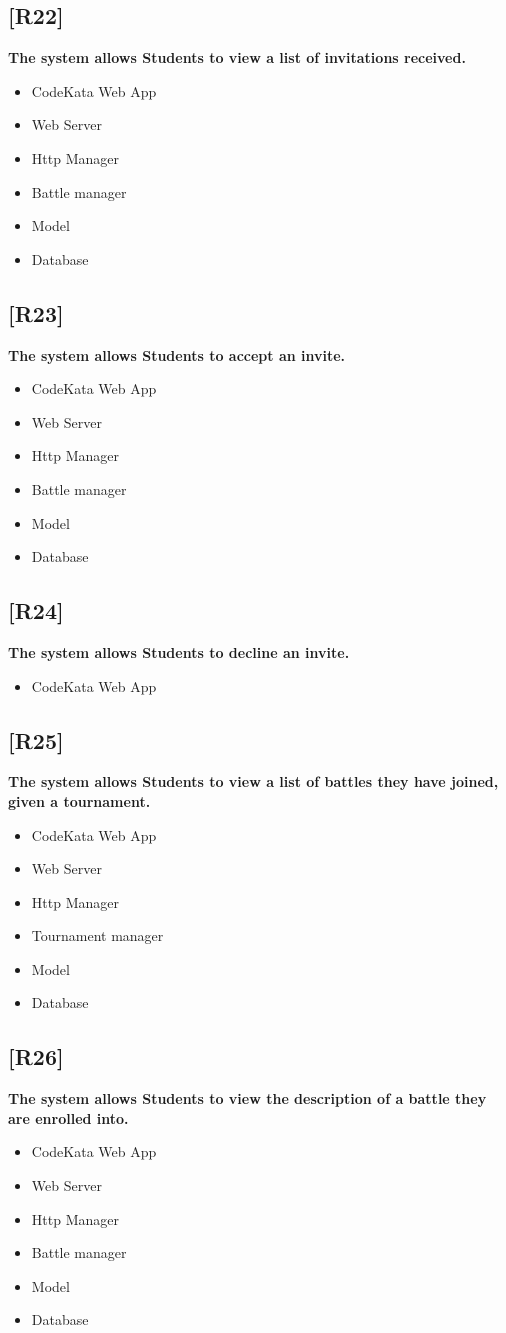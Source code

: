 \documentclass{article}
\begin{document}
\subsection{[R22]}
\textbf{ The system allows Students to view a list of invitations received.}
\begin{itemize}
\item CodeKata Web App
\item Web Server
\item Http Manager
\item Battle manager
\item Model
\item Database
\end{itemize}
\subsection{[R23]}
\textbf{ The system allows Students to accept an invite.}
\begin{itemize}
\item CodeKata Web App
\item Web Server
\item Http Manager
\item Battle manager
\item Model
\item Database
\end{itemize}
\subsection{[R24]}
\textbf{ The system allows Students to decline an invite.}
\begin{itemize}
\item CodeKata Web App
\end{itemize}
\subsection{[R25]}
\textbf{ The system allows Students to view a list of battles they have joined, given a tournament.}
\begin{itemize}
\item CodeKata Web App
\item Web Server
\item Http Manager
\item Tournament manager
\item Model
\item Database
\end{itemize}
\subsection{[R26]}
\textbf{ The system allows Students to view the description of a battle they are enrolled into.}
\begin{itemize}
\item CodeKata Web App
\item Web Server
\item Http Manager
\item Battle manager
\item Model
\item Database
\end{itemize}
\end{document}
